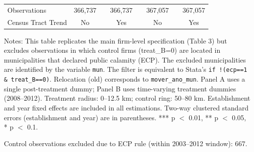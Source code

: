 \begin{table}[htb]
{\begin{threeparttable}
\begin{tabular}{lccccccc}
    Observations & 366{,}737 &  & 366{,}737 &  & 367{,}057 &  & 367{,}057\\
    Census Tract Trend & No &  & Yes &  & No &  & Yes\\
    \bottomrule
    \end{tabular}%
   	\begin{tablenotes}[flushleft] \item \small Notes: This table replicates the main firm-level specification (Table 3) but excludes observations in which control firms (treat\_B=0) are located in municipalities that declared public calamity (ECP). The excluded municipalities are identified by the variable \texttt{mun}. The filter is equivalent to Stata's \texttt{if !(ecp==1 \& treat\_B==0)}. Relocation (old) corresponds to \texttt{mover\_ano\_mun}. Panel A uses a single post-treatment dummy; Panel B uses time-varying treatment dummies (2008--2012). Treatment radius: 0--12.5 km; control ring: 50--80 km. Establishment and year fixed effects are included in all estimations. Two-way clustered standard errors (establishment and year) are in parentheses. *** p $<$ 0.01, ** p $<$ 0.05, * p $<$ 0.1. 
   	\item \small Control observations excluded due to ECP rule (within 2003--2012 window): 667.
   	\end{tablenotes}
   	\end{threeparttable}
   	}
\end{table}%
